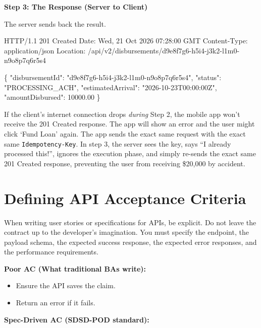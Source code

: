 \documentclass[
  11pt,
  openany,
  oneside]{book}
\newenvironment{Shaded}{}{}
\newcommand{\NormalTok}[1]{#1}
\providecommand{\tightlist}{%
  \setlength{\itemsep}{0pt}\setlength{\parskip}{0pt}}
\begin{document}
\textbf{Step 3: The Response (Server to Client)}

The server sends back the result.

\begin{Shaded}
\begin{Highlighting}[]
\NormalTok{HTTP/1.1 201 Created}
\NormalTok{Date: Wed, 21 Oct 2026 07:28:00 GMT}
\NormalTok{Content{-}Type: application/json}
\NormalTok{Location: /api/v2/disbursements/d9e8f7g6{-}h5i4{-}j3k2{-}l1m0{-}n9o8p7q6r5s4}

\NormalTok{\{}
\NormalTok{  "disbursementId": "d9e8f7g6{-}h5i4{-}j3k2{-}l1m0{-}n9o8p7q6r5s4",}
\NormalTok{  "status": "PROCESSING\_ACH",}
\NormalTok{  "estimatedArrival": "2026{-}10{-}23T00:00:00Z",}
\NormalTok{  "amountDisbursed": 10000.00}
\NormalTok{\}}
\end{Highlighting}
\end{Shaded}

If the client's internet connection drops \emph{during} Step 2, the
mobile app won't receive the 201 Created response. The app will show an
error and the user might click `Fund Loan' again. The app sends the
exact same request with the exact same \texttt{Idempotency-Key}. In step
3, the server sees the key, says ``I already processed this!'', ignores
the execution phase, and simply re-sends the exact same 201 Created
response, preventing the user from receiving \$20,000 by accident.

\section{Defining API Acceptance
Criteria}\label{defining-api-acceptance-criteria}

When writing user stories or specifications for APIs, be explicit. Do
not leave the contract up to the developer's imagination. You must
specify the endpoint, the payload schema, the expected success response,
the expected error responses, and the performance requirements.

\textbf{Poor AC (What traditional BAs write):}

\begin{itemize}
\tightlist
\item
  Ensure the API saves the claim.
\item
  Return an error if it fails.
\end{itemize}

\textbf{Spec-Driven AC (SDSD-POD standard):}
\end{document}
